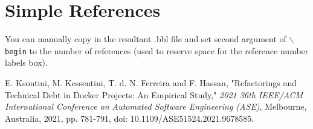 \documentclass[lettersize,journal]{IEEEtran}
\begin{document}
\section{Simple References}
You can manually copy in the resultant .bbl file and set second argument of $\backslash${\tt{begin}} to the number of references
 (used to reserve space for the reference number labels box).

\begin{thebibliography}{1}


E. Ksontini, M. Kessentini, T. d. N. Ferreira and F. Hassan, "Refactorings and Technical Debt in Docker Projects: An Empirical Study," \textit{2021 36th IEEE/ACM International Conference on Automated Software Engineering (ASE)}, Melbourne, Australia, 2021, pp. 781-791, doi: 10.1109/ASE51524.2021.9678585.

\end{thebibliography}

\vfill
\end{document}
